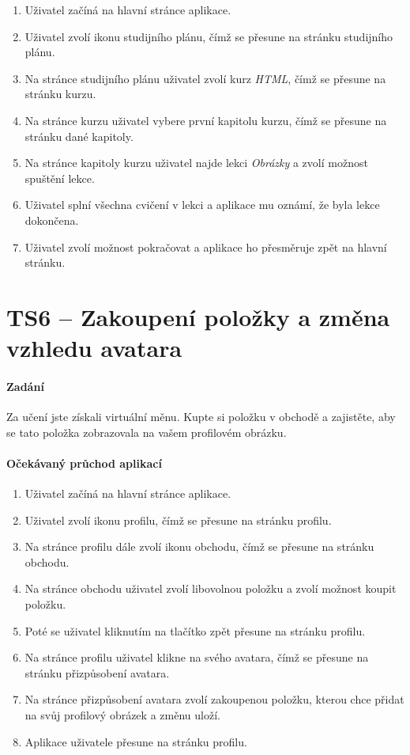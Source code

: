\begin{enumerate}
    \item Uživatel začíná na hlavní stránce aplikace.
    \item Uživatel zvolí ikonu studijního plánu, čímž se přesune na stránku studijního plánu.
    \item Na stránce studijního plánu uživatel zvolí kurz \textit{HTML}, čímž se přesune na stránku kurzu.
    \item Na stránce kurzu uživatel vybere první kapitolu kurzu, čímž se přesune na stránku dané kapitoly.
    \item Na stránce kapitoly kurzu uživatel najde lekci \textit{Obrázky} a zvolí možnost spuštění lekce.
    \item Uživatel splní všechna cvičení v lekci a aplikace mu oznámí, že byla lekce dokončena.
    \item Uživatel zvolí možnost pokračovat a aplikace ho přesměruje zpět na hlavní stránku.
\end{enumerate}

\section{TS6 -- Zakoupení položky a změna vzhledu avatara}

\paragraph{Zadání} Za učení jste získali virtuální měnu. Kupte si položku v obchodě a zajistěte, aby se tato položka zobrazovala na vašem profilovém obrázku.

\paragraph{Očekávaný průchod aplikací}

\begin{enumerate}
    \item Uživatel začíná na hlavní stránce aplikace.
    \item Uživatel zvolí ikonu profilu, čímž se přesune na stránku profilu.
    \item Na stránce profilu dále zvolí ikonu obchodu, čímž se přesune na stránku obchodu.
    \item Na stránce obchodu uživatel zvolí libovolnou položku a zvolí možnost koupit položku.
    \item Poté se uživatel kliknutím na tlačítko zpět přesune na stránku profilu.
    \item Na stránce profilu uživatel klikne na svého avatara, čímž se přesune na stránku přizpůsobení avatara.
    \item Na stránce přizpůsobení avatara zvolí zakoupenou položku, kterou chce přidat na svůj profilový obrázek a změnu uloží.
    \item Aplikace uživatele přesune na stránku profilu.
\end{enumerate}